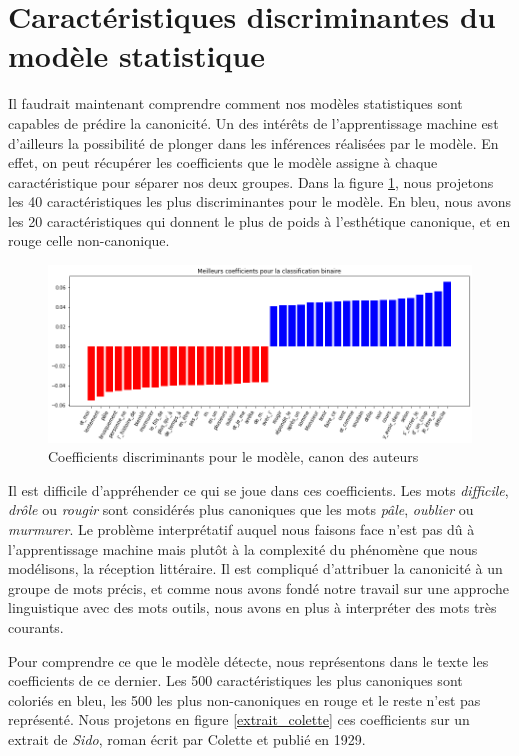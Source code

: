\section{Caractéristiques discriminantes du modèle statistique}

Il faudrait maintenant comprendre comment nos modèles statistiques sont capables de prédire la canonicité. Un des intérêts de l'apprentissage machine est d'ailleurs la possibilité de plonger dans les inférences réalisées par le modèle. En effet, on peut récupérer les coefficients que le modèle assigne à chaque caractéristique pour séparer nos deux groupes. Dans la figure \ref{coefs}, nous projetons les 40 caractéristiques les plus discriminantes pour le modèle. En bleu, nous avons les 20 caractéristiques qui donnent le plus de poids à l'esthétique canonique, et en rouge celle non-canonique. 



\bigskip
\begin{figure}[!ht]
    \centering
    \includegraphics[width=17cm]{img/12_coef_fabula.png}
    \caption{Coefficients discriminants pour le modèle, canon des auteurs}
    \label{coefs}
\end{figure}


Il est difficile d'appréhender ce qui se joue dans ces coefficients. Les mots \textit{difficile}, \textit{drôle} ou \textit{rougir} sont considérés plus canoniques que les mots \textit{pâle}, \textit{oublier} ou \textit{murmurer}. Le problème interprétatif auquel nous faisons face n'est pas dû à l'apprentissage machine mais plutôt à la complexité du phénomène que nous modélisons, la réception littéraire. Il est compliqué d'attribuer la canonicité à un groupe de mots précis, et comme nous avons fondé notre travail sur une approche linguistique avec des mots outils, nous avons en plus à interpréter des mots très courants. 

Pour comprendre ce que le modèle détecte, nous représentons dans le texte les coefficients de ce dernier. Les 500 caractéristiques les plus canoniques sont coloriés en bleu, les 500 les plus non-canoniques en rouge et le reste n'est pas représenté. Nous projetons en figure \ref{extrait_colette} ces coefficients sur un extrait de \textit{Sido}, roman écrit par Colette et publié en 1929.

